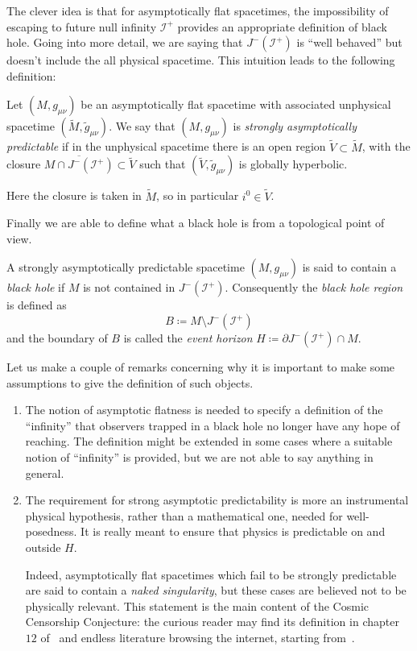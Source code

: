The clever idea is that for asymptotically flat spacetimes, the impossibility of escaping to future null infinity \(\mathscr{I}^+\) provides an appropriate definition of black hole. Going into more detail, we are saying that \(J^-(\mathscr{I}^+)\) is ``well behaved'' but doesn't include the all physical spacetime. This intuition leads to the following definition:
\begin{definition}
	Let \((M, g_{\mu\nu})\) be an asymptotically flat spacetime with associated unphysical spacetime \((\tilde{M}, \tilde{g}_{\mu\nu})\). We say that \((M, g_{\mu\nu})\)  is \emph{strongly asymptotically predictable} if in the unphysical spacetime there is an open region \(\tilde{V} \subset \tilde{M}\), with the closure \(\overline{M \cap J^-(\mathscr{I}^+)}\subset \tilde{V}\) such that \((\tilde{V}, \tilde{g}_{\mu\nu})\) is globally hyperbolic.
\end{definition}
\begin{remark}
	Here the closure is taken in \(\tilde{M}\), so in particular \(i^0 \in \tilde{V}\). 
\end{remark}
\noindent
Finally we are able to define what a black hole is from a topological point of view.
\begin{definition}
	A strongly asymptotically predictable spacetime \((M, g_{\mu\nu})\) is said to contain a \emph{black hole} if \(M\) is not contained in \(J^-(\mathscr{I}^+)\). Consequently the \emph{black hole region} is defined as 
	\[
	B \coloneqq M \setminus J^-(\mathscr{I}^+)
	\]
	and the boundary of \(B\) is called the \emph{event horizon} \(H\coloneqq \partial J^-(\mathscr{I}^+) \cap M \).
\end{definition}

\begin{remark}
	Let us make a couple of remarks concerning why it is important to make some assumptions to give the definition of such objects.
	\begin{enumerate}[label=(\Roman*)]
		\item The notion of asymptotic flatness is needed to specify a definition of the ``infinity'' that observers trapped in a black hole no longer have any hope of reaching. The definition might be extended in some cases where a suitable notion of ``infinity'' is provided, but we are not able to say anything in general.
		\item The requirement for strong asymptotic predictability is more an instrumental physical hypothesis, rather than a mathematical one, needed for well-posedness. It is really meant to ensure that physics is predictable on and outside \(H\).
		
		Indeed, asymptotically flat spacetimes which fail to be strongly predictable are said to contain a \emph{naked singularity}, but these cases are believed not to be physically relevant. This statement is the main content of the Cosmic Censorship Conjecture: the curious reader may find its definition in chapter \(12\) of~\cite{wald2010general} and endless literature browsing the internet, starting from~\cite{dias2018strong}.
	\end{enumerate}
\end{remark}

